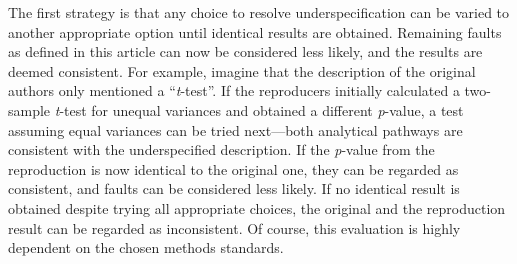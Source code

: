 \documentclass[authordate, meta]{jote-new-article}
\begin{document}
	The first strategy is that any choice to resolve underspecification can be varied to another appropriate option until identical results are obtained. Remaining faults as defined in this article can now be considered less likely, and the results are deemed consistent. For example, imagine that the description of the original authors only mentioned a “\emph{t}-test”. If the reproducers initially calculated a two-sample \emph{t}-test for unequal variances and obtained a different \emph{p}-value, a test assuming equal variances can be tried next—both analytical pathways are consistent with the underspecified description. If the \emph{p}-value from the reproduction is now identical to the original one, they can be regarded as consistent, and faults can be considered less likely. If no identical result is obtained despite trying all appropriate choices, the original and the reproduction result can be regarded as inconsistent. Of course, this evaluation is highly dependent on the chosen methods standards.
\end{document}
